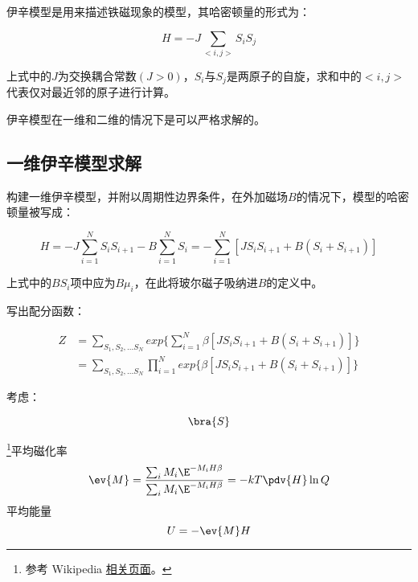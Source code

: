 
\begin{issues}
\issueDraft
\issueMissDepend
\end{issues}

伊辛模型是用来描述铁磁现象的模型，其哈密顿量的形式为：

\begin{equation}
H=-J\sum\limits_{<i,j>}S_iS_j
\end{equation}

上式中的$J$为交换耦合常数$(J>0)$，$S_i$与$S_j$是两原子的自旋，求和中的$<i,j>$代表仅对最近邻的原子进行计算。

伊辛模型在一维和二维的情况下是可以严格求解的。

\subsection{一维伊辛模型求解}

构建一维伊辛模型，并附以周期性边界条件，在外加磁场$B$的情况下，模型的哈密顿量被写成：

\begin{equation}
H=-J\sum\limits_{i=1}^NS_iS_{i+1}-B\sum\limits_{i=1}^NS_i=-\sum\limits_{i=1}^N[JS_iS_{i+1}+B(S_i+S_{i+1})]
\end{equation}

上式中的$BS_i$项中应为$B\mu_i$，在此将玻尔磁子吸纳进$B$的定义中。

写出配分函数：

\begin{align}
Z&=\sum\limits_{S_1,S_2,...S_N}exp\{\sum\limits_{i=1}^N\beta[JS_iS_{i+1}+B(S_i+S_{i+1})]\} \\
&=\sum\limits_{S_1,S_2,...S_N}\prod\limits_{i=1}^N exp\{\beta[JS_iS_{i+1}+B(S_i+S_{i+1})]\}
\end{align}

考虑：

\begin{equation}
\bra{S}
\end{equation}












\footnote{参考 Wikipedia \href{https://en.wikipedia.org/wiki/Ising_model}{相关页面}。}平均磁化率
\begin{equation}
\ev{M} = \frac{\sum_i M_i \E^{-M_i H \beta}}{\sum_i M_i \E^{-M_i H\beta}} = -kT \pdv{H} \ln Q
\end{equation}
平均能量
\begin{equation}
U = - \ev{M} H
\end{equation}
